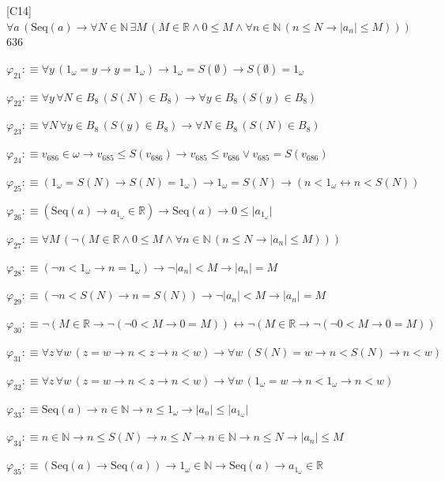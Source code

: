 \begin{fullproof}{[C14]}{$\forall a\,(\mathrm{Seq}(a) \to \forall N \in \mathbb{N}\,\exists M\,(M \in \mathbb{R} \land 0 \leq M \land \forall n \in \mathbb{N}\,(n \leq N \to \lvert a_{n} \rvert \leq M)))$}{636}
\begin{abbrevlist}
\item $\varphi_{21} :\equiv \forall y\,(1_{\omega} = y \to y = 1_{\omega}) \to 1_{\omega} = S(\emptyset) \to S(\emptyset) = 1_{\omega}$
\item $\varphi_{22} :\equiv \forall y\,\forall N \in B_{8}\,(S(N) \in B_{8}) \to \forall y \in B_{8}\,(S(y) \in B_{8})$
\item $\varphi_{23} :\equiv \forall N\,\forall y \in B_{8}\,(S(y) \in B_{8}) \to \forall N \in B_{8}\,(S(N) \in B_{8})$
\item $\varphi_{24} :\equiv v_{686} \in \omega \to v_{685} \leq S(v_{686}) \to v_{685} \leq v_{686} \lor v_{685} = S(v_{686})$
\item $\varphi_{25} :\equiv (1_{\omega} = S(N) \to S(N) = 1_{\omega}) \to 1_{\omega} = S(N) \to (n < 1_{\omega} \leftrightarrow n < S(N))$
\item $\varphi_{26} :\equiv (\mathrm{Seq}(a) \to a_{1_{\omega}} \in \mathbb{R}) \to \mathrm{Seq}(a) \to 0 \leq \lvert a_{1_{\omega}} \rvert$
\item $\varphi_{27} :\equiv \forall M\,(\neg (M \in \mathbb{R} \land 0 \leq M \land \forall n \in \mathbb{N}\,(n \leq N \to \lvert a_{n} \rvert \leq M)))$
\item $\varphi_{28} :\equiv (\neg n < 1_{\omega} \to n = 1_{\omega}) \to \neg \lvert a_{n} \rvert < M \to \lvert a_{n} \rvert = M$
\item $\varphi_{29} :\equiv (\neg n < S(N) \to n = S(N)) \to \neg \lvert a_{n} \rvert < M \to \lvert a_{n} \rvert = M$
\item $\varphi_{30} :\equiv \neg (M \in \mathbb{R} \to \neg (\neg 0 < M \to 0 = M)) \leftrightarrow \neg (M \in \mathbb{R} \to \neg (\neg 0 < M \to 0 = M))$
\item $\varphi_{31} :\equiv \forall z\,\forall w\,(z = w \to n < z \to n < w) \to \forall w\,(S(N) = w \to n < S(N) \to n < w)$
\item $\varphi_{32} :\equiv \forall z\,\forall w\,(z = w \to n < z \to n < w) \to \forall w\,(1_{\omega} = w \to n < 1_{\omega} \to n < w)$
\item $\varphi_{33} :\equiv \mathrm{Seq}(a) \to n \in \mathbb{N} \to n \leq 1_{\omega} \to \lvert a_{n} \rvert \leq \lvert a_{1_{\omega}} \rvert$
\item $\varphi_{34} :\equiv n \in \mathbb{N} \to n \leq S(N) \to n \leq N \to n \in \mathbb{N} \to n \leq N \to \lvert a_{n} \rvert \leq M$
\item $\varphi_{35} :\equiv (\mathrm{Seq}(a) \to \mathrm{Seq}(a)) \to 1_{\omega} \in \mathbb{N} \to \mathrm{Seq}(a) \to a_{1_{\omega}} \in \mathbb{R}$

\end{abbrevlist}
\end{fullproof}
